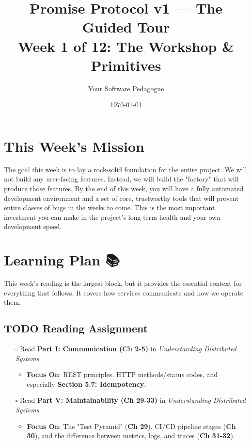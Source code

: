 \documentclass[11pt]{article}
\author{Your Software Pedagogue}
\date{\today}
\title{Promise Protocol v1 — The Guided Tour\\\medskip
\large Week 1 of 12: The Workshop \& Primitives}
\begin{document}
\maketitle
\setcounter{tocdepth}{2}
\tableofcontents

\section{This Week's Mission 🎯}
\label{sec:orgf39c3c6}
The goal this week is to lay a rock-solid foundation for the entire project. We will not build any user-facing features. Instead, we will build the "factory" that will produce those features. By the end of this week, you will have a fully automated development environment and a set of core, trustworthy tools that will prevent entire classes of bugs in the weeks to come. This is the most important investment you can make in the project's long-term health and your own development speed.
\section{Learning Plan 📚}
\label{sec:org44896b1}
This week's reading is the largest block, but it provides the essential context for everything that follows. It covers how services communicate and how we operate them.
\subsection{{\bfseries\sffamily TODO} Reading Assignment}
\label{sec:org4fcebbb}
\begin{itemize}
\item[{$\square$}] Read \textbf{Part I: Communication (Ch 2-5)} in \emph{Understanding Distributed Systems}.
\begin{itemize}
\item \textbf{Focus On}: REST principles, HTTP methods/status codes, and especially \textbf{Section 5.7: Idempotency}.
\end{itemize}
\item[{$\square$}] Read \textbf{Part V: Maintainability (Ch 29-33)} in \emph{Understanding Distributed Systems}.
\begin{itemize}
\item \textbf{Focus On}: The "Test Pyramid" (\textbf{\textbf{Ch 29}}), CI/CD pipeline stages (\textbf{\textbf{Ch 30}}), and the difference between metrics, logs, and traces (\textbf{\textbf{Ch 31-32}}).
\end{itemize}
\end{itemize}
\end{document}
